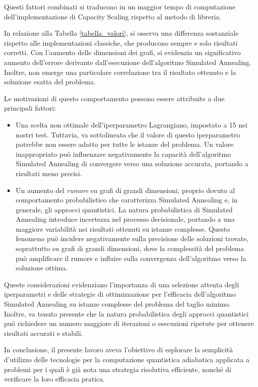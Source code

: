 \documentclass{article}
\begin{document}
Questi fattori combinati si traducono in un maggior tempo di computazione dell'implementazione di Capacity Scaling rispetto al metodo di libreria.

In relazione alla Tabella \ref{tabella_valori}, si osserva una differenza sostanziale rispetto alle implementazioni classiche, che producono sempre e solo risultati corretti. Con l'aumento delle dimensioni dei grafi, si evidenzia un significativo aumento dell'errore derivante dall'esecuzione dell'algoritmo Simulated Annealing. Inoltre, non emerge una particolare correlazione tra il risultato ottenuto e la soluzione esatta del problema.

Le motivazioni di questo comportamento possono essere attribuite a due principali fattori:

\begin{itemize}
    \item Una scelta non ottimale dell'iperparametro Lagrangiano, impostato a 15 nei nostri test. Tuttavia, va sottolineato che il valore di questo iperparametro potrebbe non essere adatto per tutte le istanze del problema. Un valore inappropriato può influenzare negativamente la capacità dell'algoritmo Simulated Annealing di convergere verso una soluzione accurata, portando a risultati meno precisi.
    \item Un aumento del \emph{rumore} su grafi di grandi dimensioni, proprio dovuto al comportamento probabilistico che caratterizza Simulated Annealing e, in generale, gli approcci quantistici. La natura probabilistica di Simulated Annealing introduce incertezza nel processo decisionale, portando a una maggiore variabilità nei risultati ottenuti su istanze complesse. Questo fenomeno può incidere negativamente sulla precisione delle soluzioni trovate, soprattutto su grafi di grandi dimensioni, dove la complessità del problema può amplificare il rumore e influire sulla convergenza dell'algoritmo verso la soluzione ottima.
\end{itemize}

Queste considerazioni evidenziano l'importanza di una selezione attenta degli iperparametri e delle strategie di ottimizzazione per l'efficacia dell'algoritmo Simulated Annealing su istanze complesse del problema del taglio minimo. Inoltre, va tenuto presente che la natura probabilistica degli approcci quantistici può richiedere un numero maggiore di iterazioni o esecuzioni ripetute per ottenere risultati accurati e stabili.

In conclusione, il presente lavoro aveva l'obiettivo di esplorare la semplicità d'utilizzo delle tecnologie per la computazione quantistica adiabatica applicata a problemi per i quali è già nota una strategia risolutiva efficiente, nonché di verificare la loro efficacia pratica.
\end{document}
